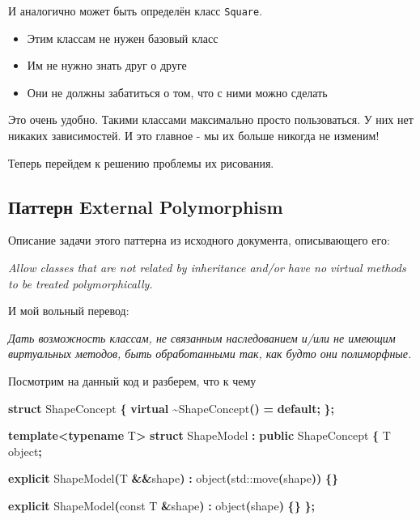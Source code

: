 \documentclass[14pt,a4paper]{article}
\providecommand{\tightlist}{%
	\setlength{\itemsep}{0pt}\setlength{\parskip}{0pt}}
\newenvironment{Shaded}{\begin{paragraph}}{\end{paragraph}}
\newenvironment{Highlighting}{\begin{paragraph}}{\end{paragraph}}
\newcommand{\KeywordTok}[1]{\textcolor[rgb]{0.13,0.29,0.53}{\textbf{#1}}}
\newcommand{\ControlFlowTok}[1]{\textcolor[rgb]{0.13,0.29,0.53}{\textbf{#1}}}
\newcommand{\OperatorTok}[1]{\textcolor[rgb]{0.81,0.36,0.00}{\textbf{#1}}}
\newcommand{\BuiltInTok}[1]{#1}
\newcommand{\AttributeTok}[1]{\textcolor[rgb]{0.77,0.63,0.00}{#1}}
\newcommand{\NormalTok}[1]{#1}
\begin{document}
И аналогично может быть определён класс \texttt{Square}.

\begin{itemize}
\tightlist
\item
  Этим классам не нужен базовый класс
\item
  Им не нужно знать друг о друге
\item
  Они не должны забатиться о том, что с ними можно сделать
\end{itemize}

Это очень удобно. Такими классами максимально просто пользоваться. У них
нет никаких зависимостей. И это главное - мы их больше никогда не
изменим!

Теперь перейдем к решению проблемы их рисования.

\hypertarget{ux43fux430ux442ux442ux435ux440ux43d-external-polymorphism}{%
\subsection{Паттерн External
Polymorphism}\label{ux43fux430ux442ux442ux435ux440ux43d-external-polymorphism}}

Описание задачи этого паттерна из исходного документа, описывающего его:

\emph{Allow classes that are not related by inheritance and/or have no
virtual methods to be treated polymorphically.}

И мой вольный перевод:

\emph{Дать возможность классам, не связанным наследованием и/или не
имеющим виртуальных методов, быть обработанными так, как будто они
полиморфные.}

Посмотрим на данный код и разберем, что к чему

\begin{Shaded}
\begin{Highlighting}[]
\KeywordTok{struct}\NormalTok{ ShapeConcept }\OperatorTok{\{}
    \KeywordTok{virtual} \OperatorTok{\textasciitilde{}}\NormalTok{ShapeConcept}\OperatorTok{()} \OperatorTok{=} \ControlFlowTok{default}\OperatorTok{;}
\OperatorTok{\};}

\KeywordTok{template}\OperatorTok{\textless{}}\KeywordTok{typename}\NormalTok{ T}\OperatorTok{\textgreater{}}
\KeywordTok{struct}\NormalTok{ ShapeModel }\OperatorTok{:} \KeywordTok{public}\NormalTok{ ShapeConcept }\OperatorTok{\{}
\NormalTok{    T object}\OperatorTok{;}

    \KeywordTok{explicit}\NormalTok{ ShapeModel}\OperatorTok{(}\NormalTok{T }\OperatorTok{\&\&}\NormalTok{shape}\OperatorTok{)} \OperatorTok{:}\NormalTok{ object}\OperatorTok{(}\BuiltInTok{std::}\NormalTok{move}\OperatorTok{(}\NormalTok{shape}\OperatorTok{))} \OperatorTok{\{\}}

    \KeywordTok{explicit}\NormalTok{ ShapeModel}\OperatorTok{(}\AttributeTok{const}\NormalTok{ T }\OperatorTok{\&}\NormalTok{shape}\OperatorTok{)} \OperatorTok{:}\NormalTok{ object}\OperatorTok{(}\NormalTok{shape}\OperatorTok{)} \OperatorTok{\{\}}
\OperatorTok{\};}
\end{Highlighting}
\end{Shaded}
\end{document}
